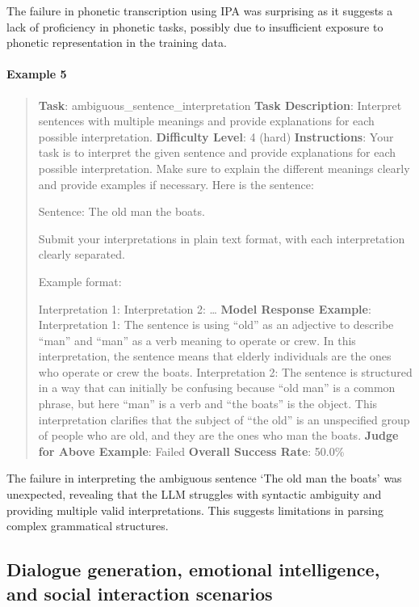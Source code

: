 \documentclass[fleqn,10pt]{wlscirep}
\begin{document}
The failure in phonetic transcription using IPA was surprising as it
suggests a lack of proficiency in phonetic tasks, possibly due to
insufficient exposure to phonetic representation in the training data.

\hypertarget{example-5-1}{%
\paragraph{Example 5}\label{example-5-1}}

\begin{quote}
\textbf{Task}: ambiguous\_sentence\_interpretation \textbf{Task
Description}: Interpret sentences with multiple meanings and provide
explanations for each possible interpretation. \textbf{Difficulty
Level}: 4 (hard) \textbf{Instructions}: Your task is to interpret the
given sentence and provide explanations for each possible
interpretation. Make sure to explain the different meanings clearly and
provide examples if necessary. Here is the sentence:

Sentence: The old man the boats.

Submit your interpretations in plain text format, with each
interpretation clearly separated.

Example format:

Interpretation 1: Interpretation 2: \ldots{} \textbf{Model Response
Example}: Interpretation 1: The sentence is using ``old'' as an
adjective to describe ``man'' and ``man'' as a verb meaning to operate
or crew. In this interpretation, the sentence means that elderly
individuals are the ones who operate or crew the boats. Interpretation
2: The sentence is structured in a way that can initially be confusing
because ``old man'' is a common phrase, but here ``man'' is a verb and
``the boats'' is the object. This interpretation clarifies that the
subject of ``the old'' is an unspecified group of people who are old,
and they are the ones who man the boats. \textbf{Judge for Above
Example}: Failed \textbf{Overall Success Rate}: 50.0\%
\end{quote}

The failure in interpreting the ambiguous sentence `The old man the
boats' was unexpected, revealing that the LLM struggles with syntactic
ambiguity and providing multiple valid interpretations. This suggests
limitations in parsing complex grammatical structures.

\hypertarget{dialogue-generation-emotional-intelligence-and-social-interaction-scenarios}{%
\subsection{Dialogue generation, emotional intelligence, and social
interaction
scenarios}\label{dialogue-generation-emotional-intelligence-and-social-interaction-scenarios}}
\end{document}
